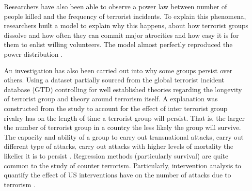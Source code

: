 Researchers have also been able to observe a power law between number of people killed and the frequency of terrorist incidents. To explain this phenomena, researchers built a model to explain why this happens, about how terrorist groups dissolve and how often they can commit major atrocities and how easy it is for them to enlist willing volunteers. The model almost perfectly reproduced the power distribution \citep{clauset2005scale}.

An investigation has also been carried out into why some groups persist over others. Using a dataset partially sourced from the global terrorist incident database (GTD) controlling for well established theories regarding the longevity of terrorist group and theory around terrorism itself. A  explanation was constructed from the study to account for the effect of inter terrorist group rivalry has on the length of time a terrorist group will persist. That is, the larger the number of terrorist group in a country the less likely the group will survive. The capacity and ability of a group to carry out transnational attacks, carry out different type of attacks, carry out attacks with higher levels of mortality the likelier it is to persist \citep{young2014survival}. Regression methods (particularly survival) are quite common to the study of counter terrorism. Particularly, intervention analysis to quantify the effect of US interventions have on the number of attacks due to terrorism \citep{enders1993effectiveness}.

